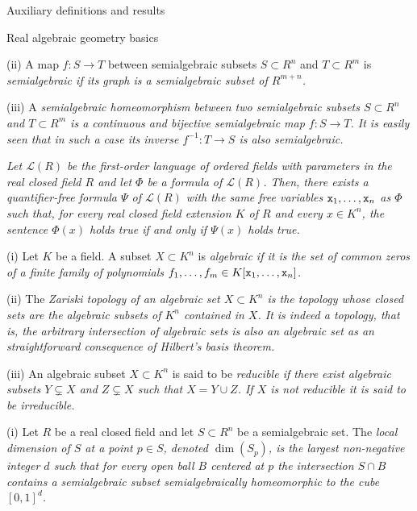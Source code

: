 \documentclass[11pt, a4paper, english, twoside, notitlepage, openright]{report}
\begin{document}
\begin{chapter}{Auxiliary definitions and results}
\begin{section}{Real algebraic geometry basics}
\begin{definitions}
	
(ii) A map $f:S\to T$ between semialgebraic subsets $S\subset R^n$ and $T\subset R^m$ is \em semialgebraic \em if its graph is a semialgebraic subset of $R^{m+n}$.  \end{definitions}


(iii) A \em semialgebraic homeomorphism \em between two semialgebraic subsets $S\subset R^n$ and $T\subset R^m$ is a continuous and bijective semialgebraic map $f:S\to T$. It is easily seen that in such a case its inverse $f^{-1}:T\to S$ is also semialgebraic.

\begin{theorem}\label{TP} \em Let ${\mathcal L}(R)$ be the first-order language of ordered fields with parameters in the real closed field $R$ and let $\Phi$ be a formula of ${\mathcal L}(R)$. Then, there exists a quantifier-free formula $\Psi$ of ${\mathcal L}(R)$ with the same free variables ${\tt x}_1,\dots,{\tt x}_n$ as $\Phi$ such that, for every real closed field extension $K$ of $R$ and every $x\in K^n$, the sentence $\Phi(x)$ holds true if and only if $\Psi(x)$ holds true.\em

\end{theorem}

\begin{definition}\label{zariski} (i) Let $K$ be a field. A subset $X\subset K^n$ is \em algebraic \em if it is the set of common zeros of a finite family of polynomials $f_1,\dots,f_m\in K[{\tt x}_1,\dots,{\tt x}_n]$. 

(ii) The \em Zariski topology \em of an algebraic set $X\subset K^n$ is the topology whose closed sets are the algebraic subsets of $K^n$ contained in $X$. It is indeed a topology, that is, the arbitrary intersection of algebraic sets is also an algebraic set as an straightforward consequence of Hilbert's basis theorem.

(iii) An algebraic subset $X\subset K^n$ is said to be \em reducible \em if there exist algebraic subsets $Y\subsetneq X$ and  $Z\subsetneq X$ such that $X=Y\cup Z$. If $X$ is not reducible it is said to be  \em irreducible. \em 
\end{definition}

\begin{definition}\label{pureDim} (i) Let $R$ be a real closed field and let $S\subset R^n$ be a semialgebraic set. The \em local dimension of $S$ at a point $p\in S$, \em denoted $\dim(S_p)$, is the largest non-negative integer $d$ such that for every open ball $B$ centered at $p$ the intersection $S\cap B$ contains a semialgebraic subset semialgebraically homeomorphic to the cube $[0,1]^d$.


\end{definition}
\end{section}
\end{chapter}
\end{document}
